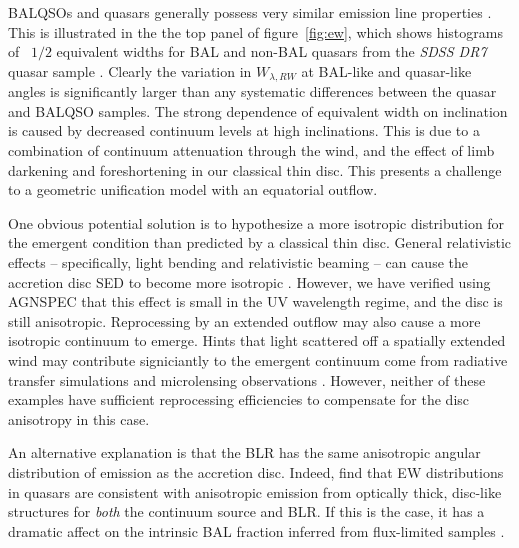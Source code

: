 \documentclass[useAMS,usenatbib]{mn2e_x}
\begin{document}
BALQSOs and quasars generally possess very similar emission line properties 
\citep[e.g.][]{weymann1991,reichard2003}. This is illustrated in the 
the top panel of figure~\ref{fig:ew}, which shows histograms 
of \civ\ $1/2$ equivalent widths for BAL and non-BAL quasars from the {\sl SDSS DR7} quasar
sample \citep{shen2011}. Clearly the variation in $W_{\lambda,RW}$ at 
BAL-like and quasar-like angles is significantly larger than any systematic 
differences between the quasar and BALQSO samples.
The strong dependence of equivalent width on inclination is caused by decreased continuum
levels at high inclinations. This is due to a combination of
continuum attenuation through the wind, and the effect of limb darkening and foreshortening
in our classical thin disc. This presents a challenge to a geometric unification model
with an equatorial outflow.

One obvious potential solution is to hypothesize a more isotropic distribution 
for the emergent condition than predicted by a classical thin disc. 
General relativistic effects -- specifically, light bending
and relativistic beaming -- can cause 
the accretion disc SED to become more isotropic \citep[e.g.][]{zhang1997,munozdarias2013}. 
However, we have verified using AGNSPEC \citep{hubeny2000,hubeny2001,hubenyhubeny1997}
that this effect is small in the UV wavelength regime, 
and the disc is still anisotropic.
Reprocessing by an extended outflow may also cause a more isotropic
continuum to emerge. Hints that light scattered off a spatially extended 
wind may contribute signiciantly to the emergent continuum come from radiative transfer
simulations \citep{simproga2012} and microlensing observations \citep{sluse2015}.
However, neither of these examples have sufficient reprocessing efficiencies to 
compensate for the disc anisotropy in this case.

An alternative explanation is that the BLR has the same anisotropic 
angular distribution of emission as the accretion disc.
Indeed, \cite{risaliti2011} find that EW distributions in quasars 
are consistent with anisotropic emission 
from optically thick, disc-like structures for {\em both} the continuum source and BLR. 
If this is the case, it has a dramatic affect on the intrinsic
BAL fraction inferred from flux-limited samples \citep{goodrich1997,krolikvoit1998}. 
\end{document}
